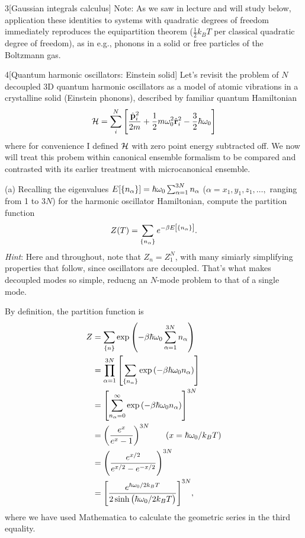 \documentclass[12pt]{article}
\begin{document}
\begin{problem}{3}[Gaussian integrals calculus]
Note: As we saw in lecture and will study below, application these identities to
systems with quadratic degrees of freedom immediately reproduces the
equipartition theorem ($\frac12k_BT$ per classical quadratic degree of freedom),
as in e.g., phonons in a solid or free particles of the Boltzmann gas.

\end{problem}
\newpage
\begin{problem}{4}[Quantum harmonic oscillators: Einstein solid]
Let's revisit the problem of $N$ decoupled 3D quantum harmonic oscillators as a
model of atomic vibrations in a crystalline solid (Einstein phonons), described
by familiar quantum Hamiltonian
\begin{equation}
    \mathcal{H}=\sum_{i}^N
    \qty[\frac{\hat{\vb{p}}_i^2}{2m}
    +\frac12m\omega_0^2\hat{\vb{r}}_i^2-\frac32\hbar\omega_0] 
\end{equation}
where for convenience I defined $\mathcal{H}$ with zero point energy subtracted off. We
now will treat this probem within canonical ensemble formalism to be compared
and contrasted with its earlier treatment with microcanonical ensemble.

(a) Recalling the eigenvalues
$E[\qty{n_\alpha}]=\hbar\omega_0\sum_{\alpha=1}^{3N}n_\alpha$
($\alpha=x_1,y_1,z_1,\hdots,$ ranging from 1 to $3N$) for the harmonic
oscillator Hamiltonian, compute the partition function
\begin{equation}
    Z(T)=\sum_{\qty{n_\alpha}}e^{-\beta E\qty[\qty{n_\alpha}]}.
\end{equation}
\textit{Hint}: Here and throughout, note that $Z_n=Z_1^N$, with many simiarly
simplifying properties that follow, since oscillators are decoupled. That's what
makes decoupled modes so simple, reducng an $N$-mode problem to that of a single
mode.
\begin{solution}
By definition, the partition function is
\begin{align}
    Z
    &=\sum_\qty{n}\exp\qty(-\beta\hbar\omega_0\sum_{\alpha=1}^{3N}n_\alpha) \notag\\
    &=\prod_{\alpha=1}^{3N}\qty[\sum_\qty{n_\alpha}\exp\qty(-\beta\hbar\omega_0n_\alpha)]\notag\\
    &=\qty[\sum_{n_\alpha=0}^\infty\exp\qty(-\beta\hbar\omega_0n_\alpha)]^{3N}\notag\\
    &=\qty(\frac{e^{x}}{e^x-1})^{3N}\tag{$x=\hbar\omega_0/k_BT$}\\
    &=\qty(\frac{e^{x/2}}{e^{x/2}-e^{-x/2}})^{3N}\notag\\
    &=\qty[\frac{e^{\hbar\omega_0/2k_BT}}{2\sinh\qty(\hbar\omega_0/2k_BT)}]^{3N},
\end{align}
where we have used Mathematica to calculate the geometric series in the third
equality.
\end{solution}


\end{problem}
\end{document}
